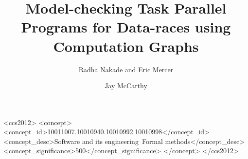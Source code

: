\documentclass[sigconf,table]{acmart}
\begin{document}
\title{Model-checking Task Parallel Programs for Data-races using Computation Graphs}


\author{Radha Nakade and Eric Mercer}
\orcid{}

\author{Jay McCarthy}

\renewcommand{\shortauthors}{R. Nakade, E. Mercer, and J. McCarthy}

\begin{abstract}

\end{abstract}

%
%
\begin{CCSXML}
<ccs2012>
<concept>
<concept_id>10011007.10010940.10010992.10010998</concept_id>
<concept_desc>Software and its engineering~Formal methods</concept_desc>
<concept_significance>500</concept_significance>
</concept>
</ccs2012>
\end{CCSXML}




\maketitle











 
\end{document}
